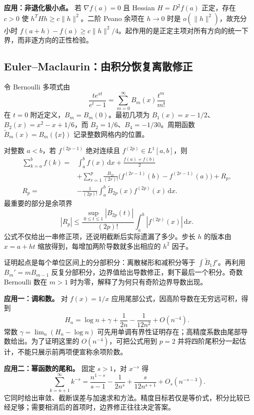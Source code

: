 \documentclass[12pt,fontset=fandol]{ctexart}
\begin{document}
\textbf{应用：非退化极小点。} 若 $\nabla f(a)=0$ 且 Hessian $H=D^2f(a)$ 正定，存在 $c>0$ 使 $h^THh\geq c\|h\|^2$。二阶 Peano 余项在 $h\to0$ 时是 $o(\|h\|^2)$，故充分小时 $f(a+h)-f(a)\geq c\|h\|^2/4$。起作用的是正定主项对所有方向的统一下界，而非逐方向的正性检验。

\subsection{Euler–Maclaurin：由积分恢复离散修正}

\label{app:taylor-em}

令 Bernoulli 多项式由
\[
\frac{te^{xt}}{e^t-1}=\sum_{m=0}^\infty B_m(x)\frac{t^m}{m!}
\]
在 $t=0$ 附近定义，$B_m=B_m(0)$。最初几项为 $B_1(x)=x-1/2$、$B_2(x)=x^2-x+1/6$，而 $B_2=1/6$、$B_4=-1/30$。周期函数 $\widetilde B_m(x)=B_m(\{x\})$ 记录整数网格内的位置。

对整数 $a<b$，若 $f^{(2p-1)}$ 绝对连续且 $f^{(2p)}\in L^1[a,b]$，则
\[
\begin{aligned}
\sum_{k=a}^bf(k)
={}&\int_a^bf(x)\,\mathrm dx+\frac{f(a)+f(b)}2\\
&+\sum_{r=1}^p\frac{B_{2r}}{(2r)!}
\bigl(f^{(2r-1)}(b)-f^{(2r-1)}(a)\bigr)+R_p,\\
R_p={}&-\frac1{(2p)!}\int_a^b\widetilde B_{2p}(x)f^{(2p)}(x)\,\mathrm dx.
\end{aligned}
\]
最重要的部分是余项界
\[
|R_p|\leq\frac{\sup_{0\leq t\leq1}|B_{2p}(t)|}{(2p)!}
\int_a^b|f^{(2p)}(x)|\,\mathrm dx.
\]
公式不仅给出一串修正项，还说明截断后实际遗漏了多少。步长 $h$ 的版本由 $x=a+ht$ 缩放得到，每增加两阶导数就多出相应的 $h^2$ 因子。

证明起点是每个单位区间上的分部积分：离散梯形和减积分等于 $\int\widetilde B_1f'$。再利用 $B_m'=mB_{m-1}$ 反复分部积分，边界值给出导数修正，剩下最后一个积分。奇数 Bernoulli 数在 $m>1$ 时为零，解释了为何只有奇阶边界导数出现。

\textbf{应用一：调和数。} 对 $f(x)=1/x$ 应用尾部公式，因高阶导数在无穷远可积，得到
\[
H_n=\log n+\gamma+\frac1{2n}-\frac1{12n^2}+O(n^{-4}).
\]
常数 $\gamma=\lim_n(H_n-\log n)$ 可先用单调有界性证明存在；高精度系数由尾部导数给出。为了证明这里的 $O(n^{-4})$，可把公式用到 $p=2$ 并将四阶尾积分一起估计，不能只展示前两项便宣称余项阶数。

\textbf{应用二：幂函数的尾和。} 固定 $s>1$，对 $x^{-s}$ 得
\[
\sum_{k=n+1}^\infty k^{-s}
=\frac{n^{1-s}}{s-1}-\frac1{2n^s}
+\frac{s}{12n^{s+1}}+O_s(n^{-s-3}).
\]
它同时给出审敛、截断误差与加速求和方法。精度目标若仅是等价式，积分比较已经足够；需要相消后的首项时，边界修正往往决定答案。
\end{document}
